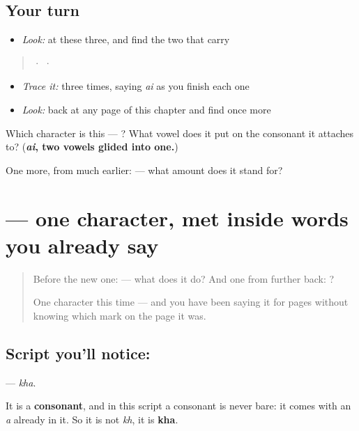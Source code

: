 \subsection*{Your turn}
\begin{itemize}
\raggedright
  \item \emph{Look:} at these three, and find the two that carry 
\end{itemize}

\begin{quote}
  ·    ·  
\end{quote}

\begin{itemize}
\raggedright
  \item \emph{Trace it:}  three times, saying \emph{ai} as you finish each one
  \item \emph{Look:} back at any page of this chapter and find  once more
\end{itemize}

\begin{tcolorbox}[breakable,colback=teal!4,colframe=teal!35!black,title={Before you move on}]
Which character is this — ? What vowel does it put on the consonant it attaches to? (\textbf{\emph{ai}, two vowels glided into one.})

One more, from much earlier:  — what amount does it stand for?
\end{tcolorbox}
\section[\texorpdfstring{\te{ఖ} (kha)}{ఖ (kha)}]{ — one character, met inside words you already say}

\label{lesson:TE-S137-letter-kha}



\begin{quote}
Before the new one:  — what does it do? And one from further back: ?

One character this time — and you have been saying it for pages without knowing which mark on the page it was.
\end{quote}

\subsection*{Script you'll notice: }
\textbf{} — \emph{kha}.

It is a \textbf{consonant}, and in this script a consonant is never bare: it comes with an \emph{a} already in it. So it is not \emph{kh}, it is \textbf{kha}.

